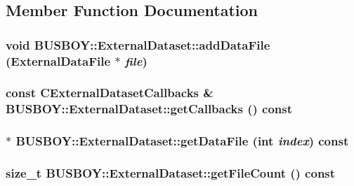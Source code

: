 \subsection{Member Function Documentation}
\hypertarget{classBUSBOY_1_1ExternalDataset_a8b45a79432fd8c06fab25d8d3c27a49f}{
\subsubsection[{addDataFile}]{\setlength{\rightskip}{0pt plus 5cm}void BUSBOY::ExternalDataset::addDataFile ({\bf ExternalDataFile} $\ast$ {\em file})}}
\label{classBUSBOY_1_1ExternalDataset_a8b45a79432fd8c06fab25d8d3c27a49f}
\hypertarget{classBUSBOY_1_1ExternalDataset_a5fd6d9135a9325f4991c8c5245286db2}{
\subsubsection[{getCallbacks}]{\setlength{\rightskip}{0pt plus 5cm}const {\bf CExternalDatasetCallbacks} \& BUSBOY::ExternalDataset::getCallbacks () const}}
\label{classBUSBOY_1_1ExternalDataset_a5fd6d9135a9325f4991c8c5245286db2}
\hypertarget{classBUSBOY_1_1ExternalDataset_a9df59df2039abbe0171ed8ff33ba5d9c}{
\subsubsection[{getDataFile}]{ $\ast$ BUSBOY::ExternalDataset::getDataFile (int {\em index}) const}}
\label{classBUSBOY_1_1ExternalDataset_a9df59df2039abbe0171ed8ff33ba5d9c}
\hypertarget{classBUSBOY_1_1ExternalDataset_adb7bdaf990a57db360a1144caf44ee59}{
\subsubsection[{getFileCount}]{\setlength{\rightskip}{0pt plus 5cm}size\_\-t BUSBOY::ExternalDataset::getFileCount () const}}
